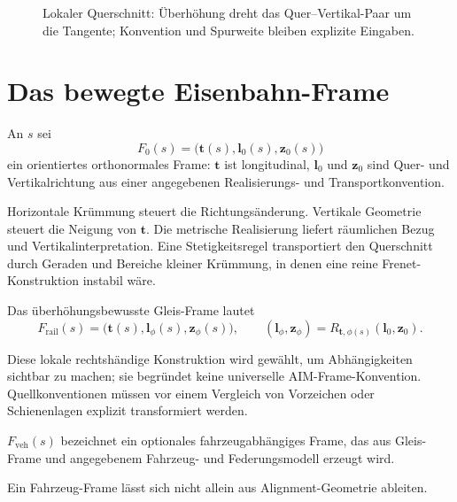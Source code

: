 \begin{figure}[htbp]
\centering

\caption{Lokaler Querschnitt: Überhöhung dreht das Quer--Vertikal-Paar um die Tangente; Konvention und Spurweite bleiben explizite Eingaben.}
\label{fig:cant-interpretation}
\end{figure}

\section{Das bewegte Eisenbahn-Frame}

\begin{definition}
\label{def:uncanted-frame}
An \(s\) sei
\[
F_0(s)=\bigl(\mathbf t(s),\mathbf l_0(s),\mathbf z_0(s)\bigr)
\]
ein orientiertes orthonormales Frame: \(\mathbf t\) ist longitudinal,
\(\mathbf l_0\) und \(\mathbf z_0\) sind Quer- und Vertikalrichtung aus einer
angegebenen Realisierungs- und Transportkonvention.
\end{definition}

Horizontale Krümmung steuert die Richtungsänderung. Vertikale Geometrie steuert
die Neigung von \(\mathbf t\). Die metrische Realisierung liefert räumlichen
Bezug und Vertikalinterpretation. Eine Stetigkeitsregel transportiert den
Querschnitt durch Geraden und Bereiche kleiner Krümmung, in denen eine reine
Frenet-Konstruktion instabil wäre.

\begin{definition}
\label{def:railway-frame}
Das überhöhungsbewusste Gleis-Frame lautet
\[
F_{\mathrm{rail}}(s)=
\bigl(\mathbf t(s),\mathbf l_\phi(s),\mathbf z_\phi(s)\bigr),
\qquad
(\mathbf l_\phi,\mathbf z_\phi)
=R_{\mathbf t,\phi(s)}(\mathbf l_0,\mathbf z_0).
\]
\end{definition}

Diese lokale rechtshändige Konstruktion wird gewählt, um Abhängigkeiten
sichtbar zu machen; sie begründet keine universelle AIM-Frame-Konvention.
Quellkonventionen müssen vor einem Vergleich von Vorzeichen oder Schienenlagen
explizit transformiert werden.

\begin{definition}
\label{def:vehicle-frame}
\(F_{\mathrm{veh}}(s)\) bezeichnet ein optionales fahrzeugabhängiges Frame,
das aus Gleis-Frame und angegebenem Fahrzeug- und Federungsmodell erzeugt wird.
\end{definition}

Ein Fahrzeug-Frame lässt sich nicht allein aus Alignment-Geometrie ableiten.

